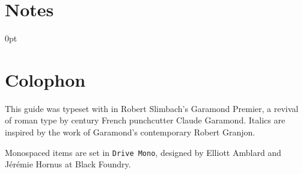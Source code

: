 \backmatter


\chapter{Notes}


\newlength{\enotewidth}
\settowidth{\enotewidth}{00.\enspace}

\renewcommand\enoteheading{}
\renewcommand\makeenmark{\theenmark.\enspace}
\renewcommand\enotesize{\normalsize}
\renewcommand\enoteformat{\leavevmode\llap{\makeenmark}}
\begin{adjustwidth}{\enotewidth}{0pt}
\raggedright
\theendnotes
\end{adjustwidth}

\chapter{Colophon}

This guide was typeset with \LuaLaTeX{} in Robert Slimbach's Garamond Premier,
a revival of roman type by  century French punchcutter
Claude Garamond.
Italics are inspired by the work of Garamond's contemporary Robert Granjon.

Monospaced items are set in \texttt{Drive Mono},
designed by Elliott Amblard and Jérémie Hornus at Black Foundry.

